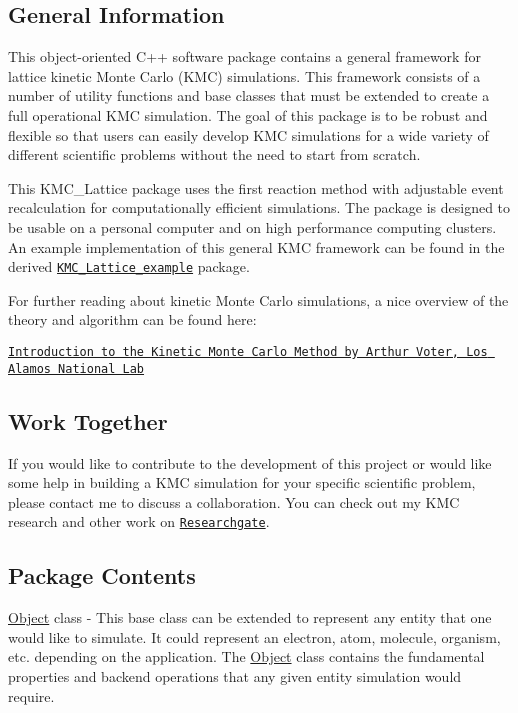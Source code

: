 \subsection*{General Information}

This object-\/oriented C++ software package contains a general framework for lattice kinetic Monte Carlo (K\+MC) simulations. This framework consists of a number of utility functions and base classes that must be extended to create a full operational K\+MC simulation. The goal of this package is to be robust and flexible so that users can easily develop K\+MC simulations for a wide variety of different scientific problems without the need to start from scratch.

This K\+M\+C\+\_\+\+Lattice package uses the first reaction method with adjustable event recalculation for computationally efficient simulations. The package is designed to be usable on a personal computer and on high performance computing clusters. An example implementation of this general K\+MC framework can be found in the derived \href{https://github.com/MikeHeiber/KMC_Lattice_example}{\tt K\+M\+C\+\_\+\+Lattice\+\_\+example} package.

For further reading about kinetic Monte Carlo simulations, a nice overview of the theory and algorithm can be found here\+:

\href{http://www.fml.t.u-tokyo.ac.jp/~izumi/CMS/MC/Introduction_kMC.pdf}{\tt Introduction to the Kinetic Monte Carlo Method by Arthur Voter, Los Alamos National Lab}

\subsection*{Work Together}

If you would like to contribute to the development of this project or would like some help in building a K\+MC simulation for your specific scientific problem, please contact me to discuss a collaboration. You can check out my K\+MC research and other work on \href{https://www.researchgate.net/profile/Michael_Heiber}{\tt Researchgate}.

\subsection*{Package Contents}

\hyperlink{class_object}{Object} class -\/ This base class can be extended to represent any entity that one would like to simulate. It could represent an electron, atom, molecule, organism, etc. depending on the application. The \hyperlink{class_object}{Object} class contains the fundamental properties and backend operations that any given entity simulation would require.

